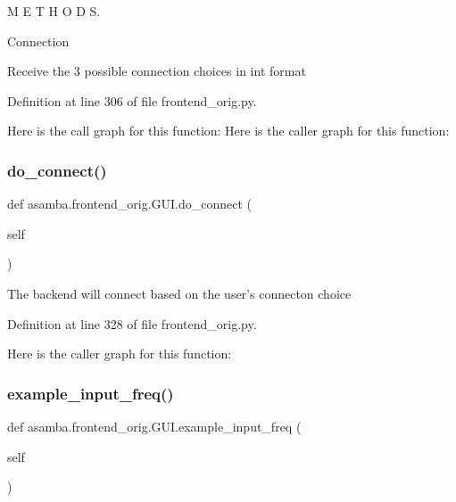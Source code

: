M E T H O D S. 

Connection \begin{DoxyVerb}Receive the 3 possible connection choices in int format \end{DoxyVerb}
 

Definition at line 306 of file frontend\+\_\+orig.\+py.

Here is the call graph for this function\+:
Here is the caller graph for this function\+:
\mbox{\label{classasamba_1_1frontend__orig_1_1_g_u_i_a68a716eaa1fb6d82a7b004c77a5ab270}} 
\subsubsection{\texorpdfstring{do\+\_\+connect()}{do\_connect()}}
{\footnotesize\ttfamily def asamba.\+frontend\+\_\+orig.\+G\+U\+I.\+do\+\_\+connect (\begin{DoxyParamCaption}\item[{}]{self }\end{DoxyParamCaption})}

\begin{DoxyVerb}The backend will connect based on the user's connecton choice \end{DoxyVerb}
 

Definition at line 328 of file frontend\+\_\+orig.\+py.

Here is the caller graph for this function\+:
\mbox{\label{classasamba_1_1frontend__orig_1_1_g_u_i_a6bb5f142abc9b56ccc0d7f9f7b3b99f1}} 
\subsubsection{\texorpdfstring{example\+\_\+input\+\_\+freq()}{example\_input\_freq()}}
{\footnotesize\ttfamily def asamba.\+frontend\+\_\+orig.\+G\+U\+I.\+example\+\_\+input\+\_\+freq (\begin{DoxyParamCaption}\item[{}]{self }\end{DoxyParamCaption})}

